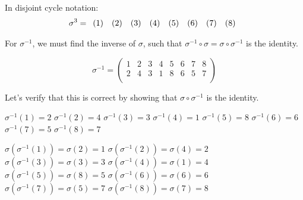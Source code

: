\documentclass[a4paper]{article}
\begin{document}
\begin{myparindent}{0pt}
In disjoint cycle notation:
\[
    \noindent \sigma^3 =
    \noindent \begin{array}{r} (1) \end{array}
    \noindent \begin{array}{r} (2) \end{array}
    \noindent \begin{array}{r} (3) \end{array}
    \noindent \begin{array}{r} (4) \end{array}
    \noindent \begin{array}{r} (5) \end{array}
    \noindent \begin{array}{r} (6) \end{array}
    \noindent \begin{array}{r} (7) \end{array}
    \noindent \begin{array}{r} (8) \end{array}
\]

For $\sigma^{-1}$, we must find the inverse of $\sigma$, such that $\sigma^{-1} \circ \sigma = \sigma \circ \sigma^{-1}$ is the identity.

\[
    \sigma^{-1} =
  \begin{pmatrix}
      1 & 2 & 3 & 4 & 5 & 6 & 7 & 8 \\
      2 & 4 & 3 & 1 & 8 & 6 & 5 & 7 \\
  \end{pmatrix}
\]

Let's verify that this is correct by showing that $\sigma \circ \sigma^{-1}$ is the identity.

$\sigma^{-1}(1) = 2$ \newline
$\sigma^{-1}(2) = 4$ \newline
$\sigma^{-1}(3) = 3$ \newline
$\sigma^{-1}(4) = 1$ \newline
$\sigma^{-1}(5) = 8$ \newline
$\sigma^{-1}(6) = 6$ \newline
$\sigma^{-1}(7) = 5$ \newline
$\sigma^{-1}(8) = 7$ \newline

$\sigma(\sigma^{-1}(1)) = \sigma(2) = 1$ \newline
$\sigma(\sigma^{-1}(2)) = \sigma(4) = 2$ \newline
$\sigma(\sigma^{-1}(3)) = \sigma(3) = 3$ \newline
$\sigma(\sigma^{-1}(4)) = \sigma(1) = 4$ \newline
$\sigma(\sigma^{-1}(5)) = \sigma(8) = 5$ \newline
$\sigma(\sigma^{-1}(6)) = \sigma(6) = 6$ \newline
$\sigma(\sigma^{-1}(7)) = \sigma(5) = 7$ \newline
$\sigma(\sigma^{-1}(8)) = \sigma(7) = 8$ \newline


\end{myparindent}
\end{document}
